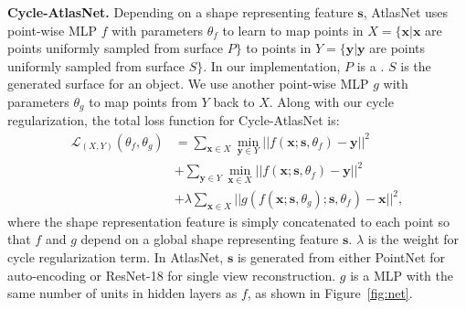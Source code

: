 \noindent\textbf{Cycle-AtlasNet.} Depending on a shape representing feature $\mathbf{s}$, AtlasNet uses point-wise MLP
$f$ with parameters $\theta_f$ to learn to map points in $X=\{\mathbf{x}| \mathbf{x}$ are points uniformly sampled from surface $P\}$ to points in $Y=\{\mathbf{y}| \mathbf{y}$ are points uniformly sampled from surface $S\}$. In our implementation, $P$ is a . $S$ is the generated surface for an object. We use another point-wise MLP $g$ with parameters $\theta_g$ to map points from $Y$ back to $X$. Along with our cycle regularization, the total loss function for Cycle-AtlasNet is:
\begin{equation}
\begin{aligned}
\label{equ:atlascycle}
\mathcal{L}_{(X,Y)}(\theta_f,\theta_g) &= \sum_{\mathbf{x} \in X} \min_{\mathbf{y} \in Y}|| f(\mathbf{x};\mathbf{s},\theta_f) - \mathbf{y} ||^2 \\ &+ \sum_{ \mathbf{y} \in Y}\min_{ \mathbf{x} \in X} || f(\mathbf{x};\mathbf{s},\theta_f) - \mathbf{y} ||^2 \\ &+ \lambda\sum_{\mathbf{x} \in X}||g(f(\mathbf{x};\mathbf{s},\theta_g);\mathbf{s},\theta_f) - \mathbf{x}||^2,
\end{aligned}
 \end{equation}
where the shape representation feature is simply concatenated to each point so that $f$ and $g$ depend on a global shape representing feature $\mathbf{s}$. $\lambda$ is the weight for cycle regularization term. In AtlasNet, $\mathbf{s}$ is generated from either PointNet \cite{resnet} for auto-encoding or ResNet-18 \cite{resnet} for single view reconstruction. $g$ is a MLP with the same number of units in hidden layers as $f$, as shown in Figure~\ref{fig:net}.

